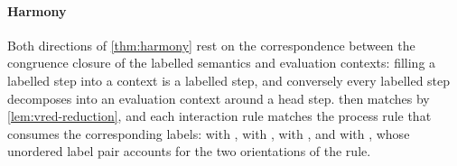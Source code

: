 \paragraph{Harmony}
Both directions of \cref{thm:harmony} rest on the correspondence
between the congruence closure of the labelled semantics and
evaluation contexts: filling a labelled step into a context is a
labelled step, and conversely every labelled step decomposes into an
evaluation context around a head step.
 then matches
 by \cref{lem:vred-reduction}, and each
interaction rule matches the process rule that consumes the
corresponding labels:  with
,  with ,
 with , and
 with , whose unordered label
pair accounts for the two orientations of the rule.
